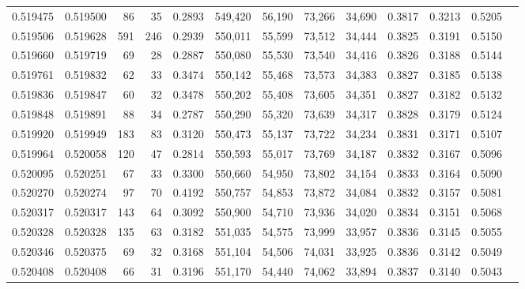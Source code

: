 \begin{tabular}{rrrrrrrrrrrrr}
0.519475 & 0.519500 &    86 &    35 &                                     0.2893 & 549,420 &  56,190 &  73,266 &  34,690 & 0.3817 & 0.3213 & 0.5205 \\
0.519506 & 0.519628 &   591 &   246 &                                     0.2939 & 550,011 &  55,599 &  73,512 &  34,444 & 0.3825 & 0.3191 & 0.5150 \\
0.519660 & 0.519719 &    69 &    28 &                                     0.2887 & 550,080 &  55,530 &  73,540 &  34,416 & 0.3826 & 0.3188 & 0.5144 \\
0.519761 & 0.519832 &    62 &    33 &                                     0.3474 & 550,142 &  55,468 &  73,573 &  34,383 & 0.3827 & 0.3185 & 0.5138 \\
0.519836 & 0.519847 &    60 &    32 &                                     0.3478 & 550,202 &  55,408 &  73,605 &  34,351 & 0.3827 & 0.3182 & 0.5132 \\
0.519848 & 0.519891 &    88 &    34 &                                     0.2787 & 550,290 &  55,320 &  73,639 &  34,317 & 0.3828 & 0.3179 & 0.5124 \\
0.519920 & 0.519949 &   183 &    83 &                                     0.3120 & 550,473 &  55,137 &  73,722 &  34,234 & 0.3831 & 0.3171 & 0.5107 \\
0.519964 & 0.520058 &   120 &    47 &                                     0.2814 & 550,593 &  55,017 &  73,769 &  34,187 & 0.3832 & 0.3167 & 0.5096 \\
0.520095 & 0.520251 &    67 &    33 &                                     0.3300 & 550,660 &  54,950 &  73,802 &  34,154 & 0.3833 & 0.3164 & 0.5090 \\
0.520270 & 0.520274 &    97 &    70 &                                     0.4192 & 550,757 &  54,853 &  73,872 &  34,084 & 0.3832 & 0.3157 & 0.5081 \\
0.520317 & 0.520317 &   143 &    64 &                                     0.3092 & 550,900 &  54,710 &  73,936 &  34,020 & 0.3834 & 0.3151 & 0.5068 \\
0.520328 & 0.520328 &   135 &    63 &                                     0.3182 & 551,035 &  54,575 &  73,999 &  33,957 & 0.3836 & 0.3145 & 0.5055 \\
0.520346 & 0.520375 &    69 &    32 &                                     0.3168 & 551,104 &  54,506 &  74,031 &  33,925 & 0.3836 & 0.3142 & 0.5049 \\
0.520408 & 0.520408 &    66 &    31 &                                     0.3196 & 551,170 &  54,440 &  74,062 &  33,894 & 0.3837 & 0.3140 & 0.5043 \\

\end{tabular}
